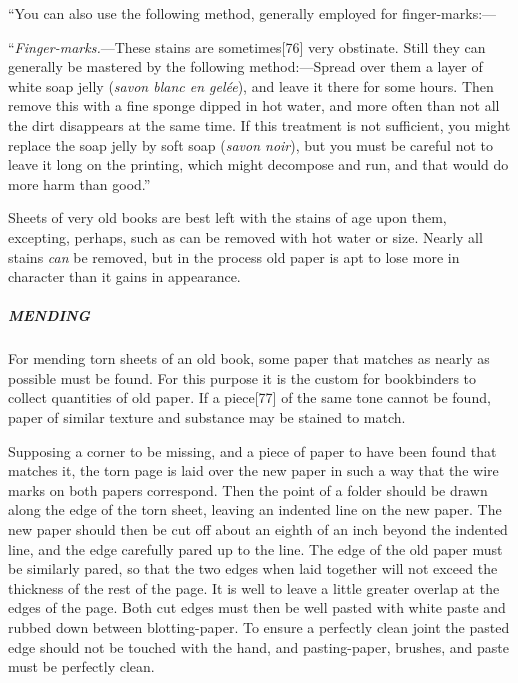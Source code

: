 \documentclass[
]{article}
\begin{document}
``You can also use the following method, generally employed for
finger-marks:---

``\emph{Finger-marks.}---These stains are
sometimes{\protect\hypertarget{Page_76}{}{{[}76{]}}} very obstinate.
Still they can generally be mastered by the following method:---Spread
over them a layer of white soap jelly (\emph{savon blanc en gelée}), and
leave it there for some hours. Then remove this with a fine sponge
dipped in hot water, and more often than not all the dirt disappears at
the same time. If this treatment is not sufficient, you might replace
the soap jelly by soft soap (\emph{savon noir}), but you must be careful
not to leave it long on the printing, which might decompose and run, and
that would do more harm than good.''

Sheets of very old books are best left with the stains of age upon them,
excepting, perhaps, such as can be removed with hot water or size.
Nearly all stains \emph{can} be removed, but in the process old paper is
apt to lose more in character than it gains in appearance.

\hypertarget{mending}{%
\subparagraph{MENDING}\label{mending}}

For mending torn sheets of an old book, some paper that matches as
nearly as possible must be found. For this purpose it is the custom for
bookbinders to collect quantities of old paper. If a
piece{\protect\hypertarget{Page_77}{}{{[}77{]}}} of the same tone cannot
be found, paper of similar texture and substance may be stained to
match.

Supposing a corner to be missing, and a piece of paper to have been
found that matches it, the torn page is laid over the new paper in such
a way that the wire marks on both papers correspond. Then the point of a
folder should be drawn along the edge of the torn sheet, leaving an
indented line on the new paper. The new paper should then be cut off
about an eighth of an inch beyond the indented line, and the edge
carefully pared up to the line. The edge of the old paper must be
similarly pared, so that the two edges when laid together will not
exceed the thickness of the rest of the page. It is well to leave a
little greater overlap at the edges of the page. Both cut edges must
then be well pasted with white paste and rubbed down between
blotting-paper. To ensure a perfectly clean joint the pasted edge should
not be touched with the hand, and pasting-paper, brushes, and paste must
be perfectly clean.
\end{document}
